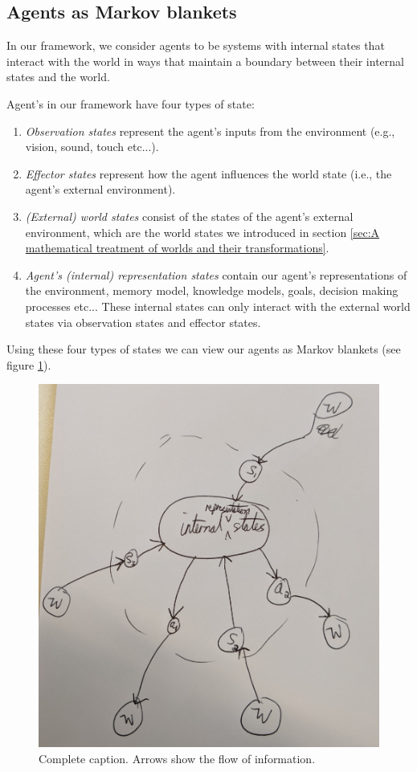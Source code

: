 \subsection{Agents as Markov blankets}

In our framework, we consider agents to be systems with internal states that interact with the world in ways that maintain a boundary between their internal states and the world.

Agent's in our framework have four types of state:
\begin{enumerate}
	\item \emph{Observation states} represent the agent's inputs from the environment (e.g., vision, sound, touch etc...).
	\item \emph{Effector states} represent how the agent influences the world state (i.e., the agent's external environment).
	\item \emph{(External) world states} consist of the states of the agent's external environment, which are the world states we introduced in section \ref{sec:A mathematical treatment of worlds and their transformations}.
	\item \emph{Agent's (internal) representation states} contain our agent's representations of the environment, memory model, knowledge models, goals, decision making processes etc...
	      These internal states can only interact with the external world states via observation states and effector states.
\end{enumerate}

Using these four types of states we can view our agents as Markov blankets (see figure \ref{fig:markov_blanket}).

\begin{figure}
	\centering
	\includegraphics[width=0.5\linewidth]{2MathematicalFramework/Images/markov_blanket.jpg}
	\caption{
		Complete caption.
		Arrows show the flow of information.
	}
	\label{fig:markov_blanket}
\end{figure}

